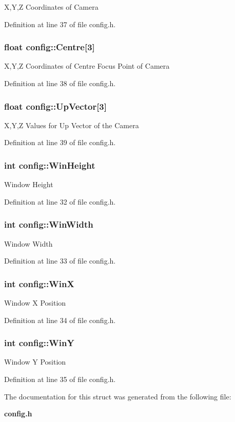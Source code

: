 X,Y,Z Coordinates of Camera 

Definition at line 37 of file config.h.
\subsubsection{\setlength{\rightskip}{0pt plus 5cm}float {\bf config::Centre}[3]}\label{structconfig_o5}


X,Y,Z Coordinates of Centre Focus Point of Camera 

Definition at line 38 of file config.h.
\subsubsection{\setlength{\rightskip}{0pt plus 5cm}float {\bf config::Up\-Vector}[3]}\label{structconfig_o6}


X,Y,Z Values for Up Vector of the Camera 

Definition at line 39 of file config.h.
\subsubsection{\setlength{\rightskip}{0pt plus 5cm}int {\bf config::Win\-Height}}\label{structconfig_o0}


Window Height 

Definition at line 32 of file config.h.
\subsubsection{\setlength{\rightskip}{0pt plus 5cm}int {\bf config::Win\-Width}}\label{structconfig_o1}


Window Width 

Definition at line 33 of file config.h.
\subsubsection{\setlength{\rightskip}{0pt plus 5cm}int {\bf config::Win\-X}}\label{structconfig_o2}


Window X Position 

Definition at line 34 of file config.h.
\subsubsection{\setlength{\rightskip}{0pt plus 5cm}int {\bf config::Win\-Y}}\label{structconfig_o3}


Window Y Position 

Definition at line 35 of file config.h.

The documentation for this struct was generated from the following file:\begin{CompactItemize}
\item 
{\bf config.h}\end{CompactItemize}
